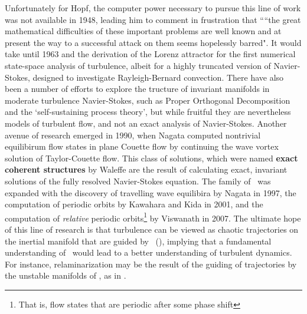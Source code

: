 Unfortunately for Hopf, the computer power necessary to pursue this line of work was not available in 1948, leading him to comment in frustration that ``“the great mathematical difficulties of these important problems are well
known and at present the way to a successful attack on them seems hopelessly
barred". It would take until 1963 and the derivation of the Lorenz attractor for the first numerical state-space analysis of turbulence, albeit for a highly truncated version of Navier-Stokes, designed to investigate Rayleigh-Bernard convection. There have also been a number of efforts to explore the tructure of invariant manifolds in moderate turbulence Navier-Stokes, such as Proper Orthogonal Decomposition and the `self-sustaining process theory', but while fruitful they are nevertheless models of turbulent flow, and not an exact analysis of Navier-Stokes. Another avenue of research emerged in 1990, when Nagata computed nontrivial equilibirum flow states in plane Couette flow by continuing the wave vortex solution of Taylor-Couette flow. This class of solutions, which were named {\bf exact coherent structures} by Waleffe are the result of calculating exact, invariant solutions of the fully resolved Navier-Stokes equation. The family of \ecs~was expanded with the discovery of travelling wave equilibira by Nagata in 1997, the computation of periodic orbits by Kawahara and Kida in 2001, and the computation of \emph{relative} periodic orbits\footnote{That is, flow states that are periodic after some phase shift} by Viswanath in 2007. The ultimate hope of this line of research is that turbulence can be viewed as chaotic trajectories on the inertial manifold that are guided by \ecs~(), implying that a fundamental understanding of \ecs~would lead to a better understanding of turbulent dynamics. For instance, relaminarization may be the result of the guiding of trajectories by the unstable manifolds of \ecs, as in .  \\



